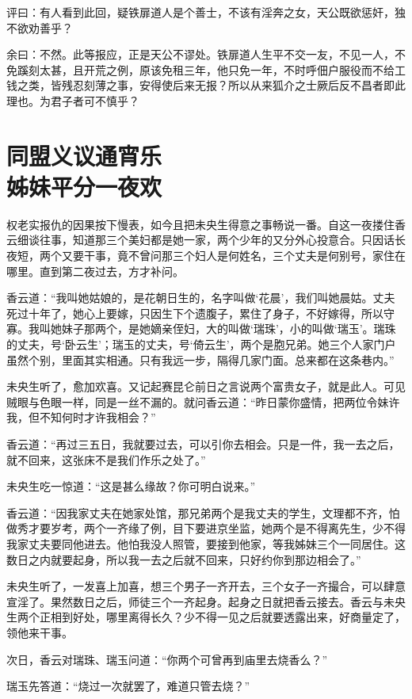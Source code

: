 \documentclass[a4paper,12pt,UTF8,twoside]{ctexbook}
\begin{document}
评曰：有人看到此回，疑铁扉道人是个善士，不该有淫奔之女，天公既欲惩奸，独不欲劝善乎？

余曰：不然。此等报应，正是天公不谬处。铁扉道人生平不交一友，不见一人，不免蹊刻太甚，且开荒之例，原该免租三年，他只免一年，不时呼佃户服役而不给工钱之类，皆残忍刻薄之事，安得使后来无报？所以从来狐介之士厥后反不昌者即此理也。为君子者可不慎乎？

\chapter[同盟义议通宵乐\ 姊妹平分一夜欢]{同盟义议通宵乐\\姊妹平分一夜欢}

权老实报仇的因果按下慢表，如今且把未央生得意之事畅说一番。自这一夜搂住香云细谈往事，知道那三个美妇都是她一家，两个少年的又分外心投意合。只因话长夜短，两个又要干事，竟不曾问那三个妇人是何姓名，三个丈夫是何别号，家住在哪里。直到第二夜过去，方才补问。

香云道：“我叫她姑娘的，是花朝日生的，名字叫做‘花晨’，我们叫她晨姑。丈夫死过十年了，她心上要嫁，只因生下个遗腹子，累住了身子，不好嫁得，所以守寡。我叫她妹子那两个，是她嫡亲侄妇，大的叫做‘瑞珠’，小的叫做‘瑞玉’。瑞珠的丈夫，号‘卧云生’；瑞玉的丈夫，号‘倚云生’，两个是胞兄弟。她三个人家门户虽然个别，里面其实相通。只有我远一步，隔得几家门面。总来都在这条巷内。”

未央生听了，愈加欢喜。又记起赛昆仑前日之言说两个富贵女子，就是此人。可见贼眼与色眼一样，同是一丝不漏的。就问香云道：“昨日蒙你盛情，把两位令妹许我，但不知何时才许我相会？”

香云道：“再过三五日，我就要过去，可以引你去相会。只是一件，我一去之后，就不回来，这张床不是我们作乐之处了。”

未央生吃一惊道：“这是甚么缘故？你可明白说来。”

香云道：“因我家丈夫在她家处馆，那兄弟两个是我丈夫的学生，文理都不齐，怕做秀才要岁考，两个一齐缘了例，目下要进京坐监，她两个是不得离先生，少不得我家丈夫要同他进去。他怕我没人照管，要接到他家，等我姊妹三个一同居住。这数日之内就要起身，所以我一去之后就不回来，只好约你到那边相会了。”

未央生听了，一发喜上加喜，想三个男子一齐开去，三个女子一齐撮合，可以肆意宣淫了。果然数日之后，师徒三个一齐起身。起身之日就把香云接去。香云与未央生两个正相到好处，哪里离得长久？少不得一见之后就要透露出来，好商量定了，领他来干事。

次日，香云对瑞珠、瑞玉问道：“你两个可曾再到庙里去烧香么？”

瑞玉先答道：“烧过一次就罢了，难道只管去烧？”
\end{document}
